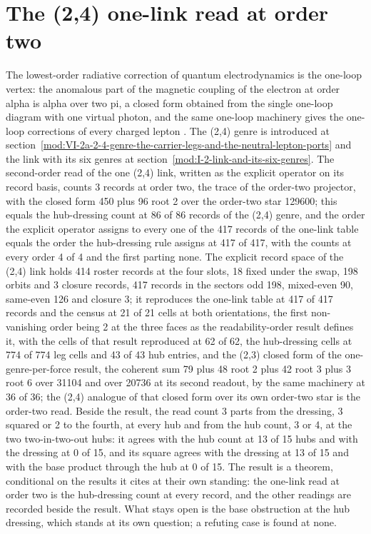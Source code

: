 \section{The (2,4) one-link read at order two}\label{mod:VI-2a-D539285-tflr-t1}
The lowest-order radiative correction of quantum electrodynamics is the one-loop vertex: the anomalous part of the magnetic coupling of the electron at order alpha is alpha over two pi, a closed form obtained from the single one-loop diagram with one virtual photon, and the same one-loop machinery gives the one-loop corrections of every charged lepton \cite{Dyson1949,Peskin1995}. The (2,4) genre is introduced at section~\ref{mod:VI-2a-2-4-genre-the-carrier-legs-and-the-neutral-lepton-ports} and the link with its six genres at section~\ref{mod:I-2-link-and-its-six-genres}.
The second-order read of the one (2,4) link, written as the explicit operator on its record basis, counts 3 records at order two, the trace of the order-two projector, with the closed form 450 plus 96 root 2 over the order-two star 129600; this equals the hub-dressing count at 86 of 86 records of the (2,4) genre, and the order the explicit operator assigns to every one of the 417 records of the one-link table equals the order the hub-dressing rule assigns at 417 of 417, with the counts at every order 4 of 4 and the first parting none.
The explicit record space of the (2,4) link holds 414 roster records at the four slots, 18 fixed under the swap, 198 orbits and 3 closure records, 417 records in the sectors odd 198, mixed-even 90, same-even 126 and closure 3; it reproduces the one-link table at 417 of 417 records and the census at 21 of 21 cells at both orientations, the first non-vanishing order being 2 at the three faces as the readability-order result defines it, with the cells of that result reproduced at 62 of 62, the hub-dressing cells at 774 of 774 leg cells and 43 of 43 hub entries, and the (2,3) closed form of the one-genre-per-force result, the coherent sum 79 plus 48 root 2 plus 42 root 3 plus 3 root 6 over 31104 and over 20736 at its second readout, by the same machinery at 36 of 36; the (2,4) analogue of that closed form over its own order-two star is the order-two read. Beside the result, the read count 3 parts from the dressing, 3 squared or 2 to the fourth, at every hub and from the hub count, 3 or 4, at the two two-in-two-out hubs: it agrees with the hub count at 13 of 15 hubs and with the dressing at 0 of 15, and its square agrees with the dressing at 13 of 15 and with the base product through the hub at 0 of 15.
The result is a theorem, conditional on the results it cites at their own standing: the one-link read at order two is the hub-dressing count at every record, and the other readings are recorded beside the result.
What stays open is the base obstruction at the hub dressing, which stands at its own question; a refuting case is found at none.

